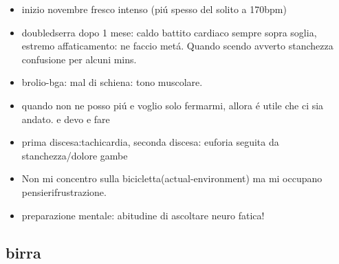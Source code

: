 \begin{itemize}
\item inizio novembre fresco intenso (pi\'u spesso del solito a 170bpm)
\item doubledserra dopo 1 mese: caldo battito cardiaco sempre sopra soglia, estremo affaticamento: ne faccio met\'a.
Quando scendo avverto stanchezza confusione per alcuni mins.
\item brolio-bga: mal di schiena: tono muscolare.
\item quando non ne posso pi\'u e voglio solo fermarmi, allora \'e utile che ci sia andato. e devo  e fare 
\item prima discesa:tachicardia, seconda discesa: euforia seguita da stanchezza/dolore gambe
\item Non mi concentro sulla bicicletta(actual-environment) ma mi occupano pensierifrustrazione.
\item preparazione mentale: abitudine di ascoltare neuro fatica!
\end{itemize}

\subsection{birra}


